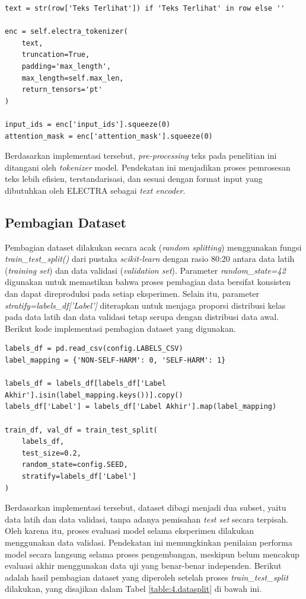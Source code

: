 \begin{lstlisting}[caption={Kode \textit{pre-processing} teks}, label={code:4.preprocessing_teks}]
text = str(row['Teks Terlihat']) if 'Teks Terlihat' in row else ''

enc = self.electra_tokenizer(
    text,
    truncation=True,
    padding='max_length',
    max_length=self.max_len,
    return_tensors='pt'
)

input_ids = enc['input_ids'].squeeze(0)
attention_mask = enc['attention_mask'].squeeze(0)
\end{lstlisting}

Berdasarkan implementasi tersebut, \textit{pre-processing} teks pada penelitian ini ditangani oleh \textit{tokenizer} model. Pendekatan ini menjadikan proses pemrosesan teks lebih efisien, terstandarisasi, dan sesuai dengan format input yang dibutuhkan oleh ELECTRA sebagai \textit{text encoder}.

\subsection{Pembagian Dataset} \label{IV.Preprocessing.Split}
Pembagian dataset dilakukan secara acak (\textit{random splitting}) menggunakan fungsi \textit{train\_test\_split()} dari pustaka \textit{scikit-learn} dengan rasio 80:20 antara data latih (\textit{training set}) dan data validasi (\textit{validation set}). Parameter \textit{random\_state=42} digunakan untuk memastikan bahwa proses pembagian data bersifat konsisten dan dapat direproduksi pada setiap eksperimen. Selain itu, parameter \textit{stratify=labels\_df['Label']} diterapkan untuk menjaga proporsi distribusi kelas pada data latih dan data validasi tetap serupa dengan distribusi data awal. Berikut kode implementasi pembagian dataset yang digunakan.

\begin{lstlisting}[caption={Kode pembagian dataset}, label={code:4.pembagian_dataset}]
labels_df = pd.read_csv(config.LABELS_CSV)
label_mapping = {'NON-SELF-HARM': 0, 'SELF-HARM': 1}

labels_df = labels_df[labels_df['Label Akhir'].isin(label_mapping.keys())].copy()
labels_df['Label'] = labels_df['Label Akhir'].map(label_mapping)

train_df, val_df = train_test_split(
    labels_df,
    test_size=0.2,
    random_state=config.SEED,
    stratify=labels_df['Label']
)
\end{lstlisting}

Berdasarkan implementasi tersebut, dataset dibagi menjadi dua subset, yaitu data latih dan data validasi, tanpa adanya pemisahan \textit{test set} secara terpisah. Oleh karena itu, proses evaluasi model selama eksperimen dilakukan menggunakan data validasi. Pendekatan ini memungkinkan penilaian performa model secara langsung selama proses pengembangan, meskipun belum mencakup evaluasi akhir menggunakan data uji yang benar-benar independen. Berikut adalah hasil pembagian dataset yang diperoleh setelah proses \textit{train\_test\_split} dilakukan, yang disajikan dalam Tabel \ref{table:4.datasplit} di bawah ini.

